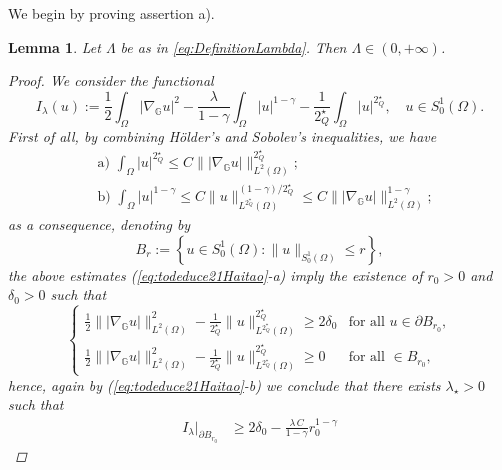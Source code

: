 \documentclass[11pt]{amsart}
\numberwithin{equation}{section} %
\newtheorem{lemma}[teo]{Lemma}
\theoremstyle{definition}
\begin{document}
\noindent We begin by proving assertion a).
\begin{lemma} \label{lem:Lambdafinito}
	Let $\Lambda$ be as in \eqref{eq:DefinitionLambda}. Then $\Lambda \in (0,+\infty)$.
	\begin{proof}
		We consider the functional 
		\begin{equation}\label{eq:FunctionalIlambda}
			I_{\lambda}(u) := \dfrac{1}{2}\int_{\Omega}|\nabla_{\mathbb{G}}u|^{2} - \dfrac{\lambda}{1-\gamma}\int_{\Omega}|u|^{1-\gamma} - \dfrac{1}{2^{\star}_{Q}}\int_{\Omega}|u|^{2^{\star}_{Q}}, \quad u \in S^{1}_{0}(\Omega).
		\end{equation}
		First of all, by combining H\"older's and Sobolev's inequalities, we have
		\begin{equation} \label{eq:todeduce21Haitao}
			\begin{split}
				& \mathrm{a)}\,\,\int_\Omega |u|^{2^{\star}_{Q}}  \leq C\||\nabla_{\mathbb{G}} u|\|_{L^{2}(\Omega)}^{2^{\star}_{Q}}; \\
				& \mathrm{b)}\,\,\int_{\Omega}|u|^{1-\gamma}  \leq C
				\|u\|_{L^{2^{\star}_{Q}}(\Omega)}^{(1-\gamma)/2^{\star}_{Q}} \leq C\||\nabla_{\mathbb{G}} u|\|^{1-\gamma}_{L^2(\Omega)};
			\end{split}
		\end{equation}
		\noindent as a consequence, denoting by 
		$$B_{r}:= \left\{ u \in S^{1}_{0}(\Omega): \|u\|_{S^{1}_{0}(\Omega)}\leq r\right\},$$
		the above estimates (\ref{eq:todeduce21Haitao}-a) imply the existence of $r_0>0$ and $\delta_0>0$ such that 
		\begin{equation}\label{eq:2.1Haitao}
			\left\{ \begin{array}{rl}
				\tfrac{1}{2}\||\nabla_{\mathbb{G}} u|\|_{L^{2}(\Omega)}^2 - \tfrac{1}{2^{\star}_{Q}}\|u\|^{2^{\star}_{Q}}_{L^{2^{\star}_{Q}}(\Omega)}\geq 2 \delta_0 & \textrm{for all } u \in \partial B_{r_0},\\[0.2cm]
				\tfrac{1}{2}\||\nabla_{\mathbb{G}} u|\|_{L^{2}(\Omega)}^2 - \tfrac{1}{2^{\star}_{Q}}\|u\|^{2^{\star}_{Q}}_{L^{2^{\star}_{Q}}(\Omega)}\geq 0 & \textrm{for all } \in B_{r_0},
			\end{array}\right.
		\end{equation}
		\noindent hence, again by (\ref{eq:todeduce21Haitao}-b) we conclude that there exists $\lambda_{\star}>0$ 
		such that
		\begin{equation}\label{eq:2.2Haitao}
			\begin{split}
				I_{\lambda}\big|_{\partial B_{r_0}} & \geq 2\delta_0 - \frac{\lambda\,C}{1-\gamma}r_0^{1-\gamma}

\end{split}
\end{equation}
\end{proof}
\end{lemma}
\end{document}
